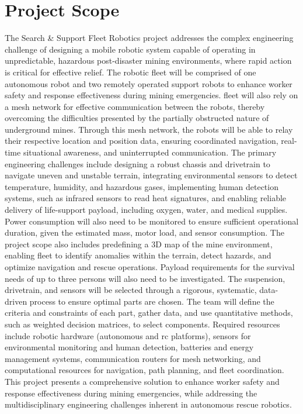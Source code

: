 \section{Project Scope}
\label{sec:project_scope}

The Search \& Support Fleet Robotics project addresses the complex engineering challenge of designing a mobile robotic system capable of operating in unpredictable, hazardous post-disaster mining environments, where rapid action is critical for effective relief. The robotic fleet will be comprised of one autonomous robot and two remotely operated support robots to enhance worker safety and response effectiveness during mining emergencies. \gls{fleet} will also rely on a mesh network for effective communication between the robots, thereby overcoming the difficulties presented by the partially obstructed nature of underground mines. Through this mesh network, the robots will be able to relay their respective location and position data, ensuring coordinated navigation, real-time situational awareness, and uninterrupted communication. The primary engineering challenges include designing a robust chassis and drivetrain to navigate uneven and unstable terrain, integrating environmental sensors to detect temperature, humidity, and hazardous gases, implementing human detection systems, such as infrared sensors to read heat signatures, and enabling reliable delivery of life-support \gls{payload}, including oxygen, water, and medical supplies. Power consumption will also need to be monitored to ensure sufficient operational duration, given the estimated mass, motor load, and sensor consumption. The project scope also includes predefining a 3D map of the mine environment, enabling \gls{fleet} to identify \gls{anomalies} within the terrain, detect hazards, and optimize navigation and rescue operations. Payload requirements for the survival needs of up to three \gls{persons} will also need to be investigated. The suspension, drivetrain, and sensors will be selected through a rigorous, systematic, data-driven process to ensure optimal parts are chosen. The team will define the criteria and constraints of each part, gather data, and use quantitative methods, such as weighted decision matrices, to select components. Required resources include robotic hardware (autonomous and \gls{rc} platforms), sensors for environmental monitoring and human detection, batteries and energy management systems, communication routers for mesh networking, and computational resources for navigation, path planning, and fleet coordination. This project presents a comprehensive solution to enhance worker safety and response effectiveness during mining emergencies, while addressing the multidisciplinary engineering challenges inherent in autonomous rescue robotics.
